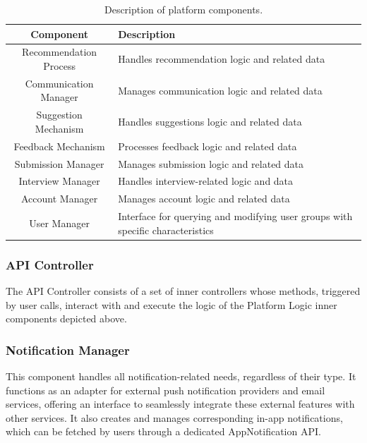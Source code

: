\begin{table}[h!]
\centering
\begin{tabular}{|c|p{10cm}|}
\hline
\textbf{Component}          & \textbf{Description}                                        \\ \hline
Recommendation Process      & Handles recommendation logic and related data              \\ \hline
Communication Manager       & Manages communication logic and related data               \\ \hline
Suggestion Mechanism        & Handles suggestions logic and related data                 \\ \hline
Feedback Mechanism          & Processes feedback logic and related data                  \\ \hline
Submission Manager          & Manages submission logic and related data                  \\ \hline
Interview Manager           & Handles interview-related logic and data                   \\ \hline
Account Manager             & Manages account logic and related data                     \\ \hline
User Manager                & Interface for querying and modifying user groups with specific characteristics \\ \hline
\end{tabular}
\caption{Description of platform components.}
\label{tab:platform_components}
\end{table}


\subsubsection{API Controller}
The API Controller consists of a set of inner controllers whose methods, triggered by user calls, interact with and execute the logic of the Platform Logic inner components depicted above.

\subsubsection{Notification Manager}
This component handles all notification-related needs, regardless of their type. It functions as an adapter for external push notification providers and email services, offering an interface to seamlessly integrate these external features with other services. It also creates and manages corresponding in-app notifications, which can be fetched by users through a dedicated AppNotification API.

